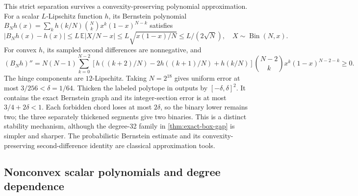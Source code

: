 This strict separation survives a convexity-preserving polynomial
approximation. For a scalar $L$-Lipschitz function $h$, its Bernstein
polynomial $B_Nh(x)=\sum_kh(k/N)\binom Nkx^k(1-x)^{N-k}$ satisfies
\begin{equation}\label{eq:bernstein-lipschitz}
 |B_Nh(x)-h(x)|
 \le L\,\mathbb E|X/N-x|
 \le L\sqrt{x(1-x)/N}\le L/(2\sqrt N),
 \quad X\sim\operatorname{Bin}(N,x).
\end{equation}
For convex $h$, its sampled second differences are nonnegative, and
\[
 (B_Nh)''=N(N-1)\sum_{k=0}^{N-2}
 [h((k+2)/N)-2h((k+1)/N)+h(k/N)]
 \binom{N-2}{k}x^k(1-x)^{N-2-k}\ge0.
\]
The hinge components are $12$-Lipschitz. Taking $N=2^{18}$ gives
uniform error at most $3/256<\delta=1/64$. Thicken the labeled
polytope in outputs by $[-\delta,\delta]^2$. It contains the exact
Bernstein graph and its integer-section error is at most
$3/4+2\delta<1$. Each forbidden chord loses at most $2\delta$,
so the binary lower remains two; the three separately thickened segments
give two binaries. This is a distinct stability mechanism, although the
degree-32 family in \cref{thm:exact-box-gap} is simpler and sharper.
The probabilistic Bernstein estimate and its convexity-preserving
second-difference identity are classical approximation tools.

\subsection{Nonconvex scalar polynomials and degree dependence}


